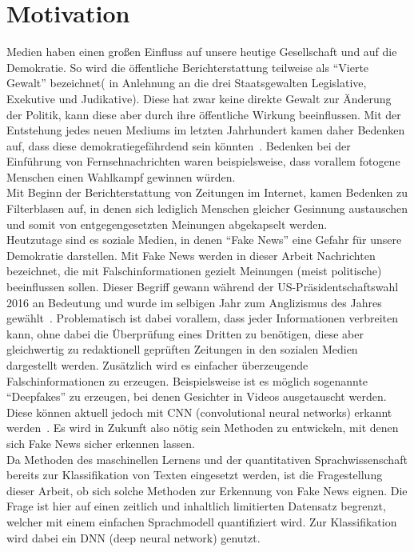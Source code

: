 \chapter{Motivation}
\label{chap:moti}
Medien haben einen großen Einfluss auf unsere heutige Gesellschaft und auf die Demokratie.
So wird die öffentliche Berichterstattung teilweise als \enquote{Vierte Gewalt} bezeichnet( 
in Anlehnung an die drei Staatsgewalten Legislative, Exekutive und Judikative). Diese hat 
zwar keine direkte Gewalt zur Änderung der Politik, kann diese aber durch ihre öffentliche 
Wirkung beeinflussen. Mit der Entstehung jedes neuen Mediums im letzten Jahrhundert kamen daher 
Bedenken auf, dass diese demokratiegefährdend sein könnten~\cite{hunt_fake}.
Bedenken bei der Einführung von Fernsehnachrichten waren beispielsweise, dass vorallem fotogene Menschen
einen Wahlkampf gewinnen würden. \\
Mit Beginn der Berichterstattung von Zeitungen im Internet,
kamen Bedenken zu Filterblasen auf, in denen sich lediglich Menschen gleicher 
Gesinnung austauschen und somit von entgegengesetzten Meinungen abgekapselt werden.\\
Heutzutage sind es soziale Medien, in denen \enquote{Fake News} eine Gefahr für unsere Demokratie 
darstellen. Mit Fake News werden in dieser Arbeit Nachrichten bezeichnet, die mit Falschinformationen
gezielt Meinungen (meist politische) beeinflussen sollen. Dieser Begriff gewann während der 
US-Präsidentschaftswahl 2016 an Bedeutung und wurde im selbigen Jahr zum Anglizismus des Jahres gewählt~\cite{nzz}.
Problematisch ist dabei vorallem, dass jeder Informationen verbreiten 
kann, ohne dabei die Überprüfung eines Dritten zu benötigen, diese aber gleichwertig
zu redaktionell geprüften Zeitungen in den sozialen Medien dargestellt werden. Zusätzlich 
wird es einfacher überzeugende Falschinformationen zu erzeugen. Beispielsweise ist es möglich
sogenannte \enquote{Deepfakes} zu erzeugen, bei denen Gesichter in Videos ausgetauscht werden.
Diese können aktuell jedoch mit CNN (convolutional neural networks) erkannt werden~\cite{deepfake}.
Es wird in Zukunft also nötig sein Methoden zu entwickeln, mit denen sich Fake News sicher erkennen lassen.\\
Da Methoden des maschinellen Lernens und der quantitativen Sprachwissenschaft bereits zur Klassifikation
von Texten eingesetzt werden, ist die Fragestellung dieser Arbeit, ob sich solche Methoden zur Erkennung 
von Fake News eignen. Die Frage ist hier auf einen zeitlich und inhaltlich 
limitierten Datensatz begrenzt, welcher mit einem einfachen Sprachmodell quantifiziert wird.
Zur Klassifikation wird dabei ein DNN (deep neural network) genutzt.